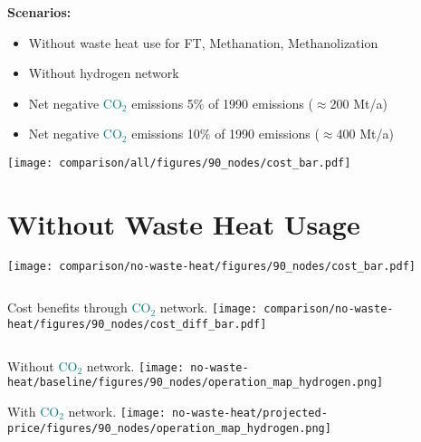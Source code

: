 \documentclass[12pt, aspectratio=169]{beamer}
\newcommand{\carbon}{\textcolor{teal}{CO$_2$}}
\begin{document}
\begin{frame}
    \textbf{Scenarios:}
    \begin{itemize}
        \item Without waste heat use for FT, Methanation, Methanolization
        \item Without hydrogen network
        \item Net negative \carbon{} emissions 5\% of 1990 emissions ($\approx$200 Mt/a)
        \item Net negative \carbon{} emissions 10\% of 1990 emissions ($\approx$400 Mt/a)
    \end{itemize}
\end{frame}


\begin{frame}
    \centering
    \texttt{[image: comparison/all/figures/90\_nodes/cost\_bar.pdf]}
\end{frame}

\section*{Without Waste Heat Usage}

\begin{frame}
    \texttt{[image: comparison/no-waste-heat/figures/90\_nodes/cost\_bar.pdf]}
\end{frame}

\begin{frame}
    \begin{columns}
        Cost benefits through \carbon{} network.
        \texttt{[image: comparison/no-waste-heat/figures/90\_nodes/cost\_diff\_bar.pdf]}
    \end{columns}
\end{frame}



\begin{frame}
    \begin{center}
    Without \carbon{} network.
    \texttt{[image: no-waste-heat/baseline/figures/90\_nodes/operation\_map\_hydrogen.png]}
    \end{center}
\end{frame}


\begin{frame}
    \begin{center}
    With \carbon{} network.
    \texttt{[image: no-waste-heat/projected-price/figures/90\_nodes/operation\_map\_hydrogen.png]}
    \end{center}
\end{frame}
\end{document}
